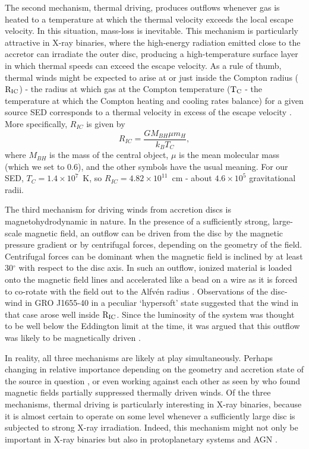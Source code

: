 \documentclass[a4paper,fleqn,usenatbib]{mnras}
\begin{document}
The second mechanism, thermal driving, produces outflows whenever gas
is heated to a temperature at which the thermal velocity exceeds
the local escape velocity. In this situation, mass-loss is
inevitable. This mechanism is particularly attractive in 
X-ray binaries, where the high-energy radiation emitted close to the
accretor can irradiate the outer disc, producing a high-temperature
surface layer in which thermal speeds can exceed the escape velocity. As a rule of thumb, thermal winds might be expected
to arise at or just inside the Compton radius ($\rm{R_{IC}}$) - the radius at which gas at the Compton temperature ($\rm{T_C}$ - 
the temperature at which the Compton heating and cooling rates balance)
for a given source SED corresponds to a thermal velocity in excess of
the escape velocity \citep{1983ApJ...271...70B}. More specifically,
$R_{IC}$ is given by 
\begin{equation}
R_{IC}=\frac{GM_{BH}\mu m_H}{k_BT_C},
\end{equation}
where $M_{BH}$ is the mass of the central object, $\mu$ is the 
mean molecular mass (which we set to 0.6), and the other symbols have the usual meaning. 
For our SED, $T_C=1.4\times10^7$~K, so $R_{IC}=4.82\times10^{11}$~cm - about $4.6\times10^5$ gravitational
radii.


The third mechanism for driving winds from accretion discs is
magnetohydrodynamic in nature. In the presence of a sufficiently
strong, large-scale magnetic field, an outflow can be driven from the
disc by the magnetic pressure gradient or by centrifugal forces,
depending on the geometry of the field. Centrifugal forces can be
dominant when the magnetic field is inclined by at least 30$^\circ$
with respect to the disc axis.  In such an outflow, ionized material
is loaded onto the magnetic field lines and accelerated like a bead on
a wire as it is forced to co-rotate with the field out to the
Alfv\'{e}n radius \citep{1982MNRAS.199..883B,2009Natur.458..481N}. 
Observations of the disc-wind in GRO J1655-40 in a
peculiar `hypersoft' state suggested that the wind in that case arose
well inside $\rm{R_{IC}}$. Since the luminosity of the system was
thought to be well below the Eddington limit at the time, it was
argued that this outflow was likely to be magnetically driven 
\citep[but also see \citealt{2006ApJ...652L.117N,2015MNRAS.451..475U,2016ApJ...823..159S}]
{1992ApJS...80..753S,2006Natur.441..953M,2008ApJ...680.1359M,2009ApJ...701..865K}.

In reality, all three mechanisms are likely at play simultaneously. 
Perhaps changing in relative importance depending on the geometry and
accretion state of the source in question \cite[e.g.][]{
2007A&ARv..15....1D,2014SSRv..183..323F}, or even working against each 
other as seen by \cite{2018MNRAS.481.2628W} who found magnetic fields
partially suppressed thermally driven winds.
Of the three mechanisms,
thermal driving is particularly interesting in X-ray binaries, because
it is almost certain to operate on some level whenever a
sufficiently large disc is subjected to strong X-ray
irradiation. Indeed, this mechanism might not only be important in
X-ray binaries but also in protoplanetary systems
\cite[e.g.][]{2012MNRAS.422.1880O} and AGN \cite[e.g.][]{2018MNRAS.476.4395B}. 
\end{document}
